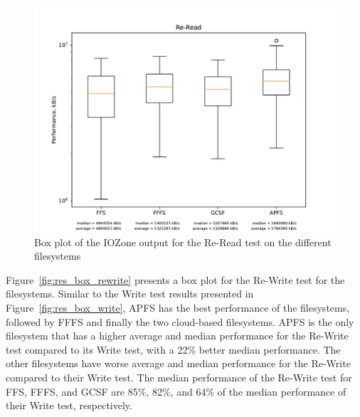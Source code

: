 \begin{figure}[!ht]
	\label{fig:res_box_reread}
	\begin{center}
		\includegraphics[width=1.0\textwidth]{figures/benchmarking/Re-Read_box.pdf}
	\end{center}
	\caption{Box plot of the IOZone output for the Re-Read test on the different filesystems}
\end{figure}

\FloatBarrier

Figure~\ref{fig:res_box_rewrite} presents a box plot for the \mbox{Re-Write} test for the filesystems. Similar to the Write test results presented in Figure~\ref{fig:res_box_write}, \gls{APFS} has the best performance of the filesystems, followed by \gls{FFFS} and finally the two cloud-based filesystems. \gls{APFS} is the only filesystem that has a higher average and median performance for the \mbox{Re-Write} test compared to its Write test, with a 22\% better median performance. The other filesystems have worse average and median performance for the \mbox{Re-Write} compared to their Write test. The median performance of the \mbox{Re-Write} test for \gls{FFS}, \gls{FFFS}, and \gls{GCSF} are 85\%, 82\%, and 64\% of the median performance of their Write test, respectively. 

